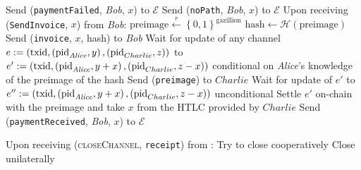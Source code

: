 \begin{algorithmic}[1]
        \Else
          \State Send (\texttt{paymentFailed}, \textit{Bob}, $x$) to $\mathcal{E}$
        \EndIf
      \Else {}
        \State Send (\texttt{noPath}, \textit{Bob}, $x$) to $\mathcal{E}$
      \EndIf
    \State
    \State Upon receiving (\texttt{SendInvoice}, $x$) from \textit{Bob}:
      \State $\mathrm{preimage} \overset{r}{\gets}
      \left\{0,1\right\}^{\mathrm{gazillion}}$
      \State $\mathrm{hash} \gets \mathcal{H}\left(\mathrm{preimage}\right)$
      \State Send (\texttt{invoice}, $x$, hash) to \textit{Bob}
      \State Wait for update of any channel $e := \left(\mathrm{txid},
      \left(\mathrm{pid}_{\mathit{Alice}}, y\right), \left(\mathrm{pid}_{Charlie},
      z\right)\right)$ to $e' := \left(\mathrm{txid},
      \left(\mathrm{pid}_{\mathit{Alice}}, y + x\right), \left(\mathrm{pid}_{Charlie}, z
      - x\right)\right)$ conditional on \textit{Alice}'s knowledge of the preimage of
      the hash
      \State Send (\texttt{preimage}) to $Charlie$
      \State Wait for update of $e'$ to $e'' := \left(\mathrm{txid},
      \left(\mathrm{pid}_{\mathit{Alice}}, y + x\right), \left(\mathrm{pid}_{Charlie}, z
      - x\right)\right)$ unconditional
        \State Settle $e'$ on-chain with the preimage and take $x$ from the HTLC
        provided by $Charlie$
      \EndIf
      \State Send (\texttt{paymentReceived}, \textit{Bob}, $x$) to $\mathcal{E}$
    \State

    \State Upon receiving (\textsc{closeChannel}, \texttt{receipt}) from
    \environment: 
    \Indent
        \State Try to close cooperatively 
         
          \State Close unilaterally 
        \EndIf
      \EndIf
    \EndIndent
    \State
  \end{algorithmic}
\hrulefill
